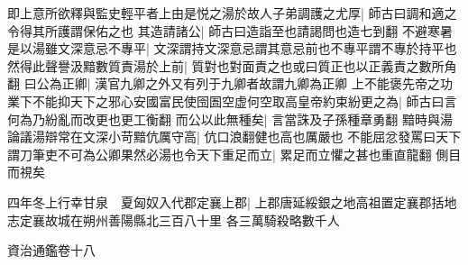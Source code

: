 即上意所欲釋與監史輕平者上由是悦之湯於故人子弟調護之尤厚|{
	師古曰調和適之令得其所護謂保佑之也}
其造請諸公|{
	師古曰造詣至也請謁問也造七到翻}
不避寒暑是以湯雖文深意忌不專平|{
	文深謂持文深意忌謂其意忌前也不專平謂不專於持平也}
然得此聲譽汲黯數質責湯於上前|{
	質對也對面責之也或曰質正也以正義責之數所角翻}
曰公為正卿|{
	漢官九卿之外又有列于九卿者故謂九卿為正卿}
上不能褒先帝之功業下不能抑天下之邪心安國富民使囹圄空虚何空取高皇帝約束紛更之為|{
	師古曰言何為乃紛亂而改更也更工衡翻}
而公以此無種矣|{
	言當誅及子孫種章勇翻}
黯時與湯論議湯辯常在文深小苛黯伉厲守高|{
	伉口浪翻健也高也厲嚴也}
不能屈忿發罵曰天下謂刀筆吏不可為公卿果然必湯也令天下重足而立|{
	累足而立懼之甚也重直龍翻}
側目而視矣

四年冬上行幸甘泉　夏匈奴入代郡定襄上郡|{
	上郡唐延綏銀之地高祖置定襄郡括地志定襄故城在朔州善陽縣北三百八十里}
各三萬騎殺略數千人

資治通鑑卷十八

